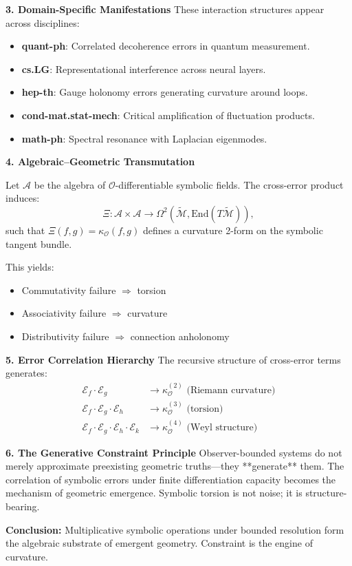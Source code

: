 \begin{scholium}
\textbf{3. Domain-Specific Manifestations}
These interaction structures appear across disciplines:
\begin{itemize}
    \item \textbf{quant-ph}: Correlated decoherence errors in quantum measurement.
    \item \textbf{cs.LG}: Representational interference across neural layers.
    \item \textbf{hep-th}: Gauge holonomy errors generating curvature around loops.
    \item \textbf{cond-mat.stat-mech}: Critical amplification of fluctuation products.
    \item \textbf{math-ph}: Spectral resonance with Laplacian eigenmodes.
\end{itemize}

\textbf{4. Algebraic–Geometric Transmutation}
\begin{theorem}
\label{theorem:bk4_multiplication_to_curvature}
Let $\mathcal{A}$ be the algebra of $\mathcal{O}$-differentiable symbolic fields. The cross-error product induces:
\[
\Xi: \mathcal{A} \times \mathcal{A} \rightarrow \Omega^2(\tilde{\mathcal{M}}, \mathrm{End}(T\tilde{\mathcal{M}})),
\]
such that $\Xi(f,g) = \kappa_{\mathcal{O}}(f,g)$ defines a curvature 2-form on the symbolic tangent bundle.
\end{theorem}

This yields:
\begin{itemize}
    \item Commutativity failure $\Rightarrow$ torsion
    \item Associativity failure $\Rightarrow$ curvature
    \item Distributivity failure $\Rightarrow$ connection anholonomy
\end{itemize}

\textbf{5. Error Correlation Hierarchy}
The recursive structure of cross-error terms generates:
\begin{align*}
    \mathcal{E}_f \cdot \mathcal{E}_g &\rightarrow \kappa_{\mathcal{O}}^{(2)} \text{ (Riemann curvature)} \\
    \mathcal{E}_f \cdot \mathcal{E}_g \cdot \mathcal{E}_h &\rightarrow \kappa_{\mathcal{O}}^{(3)} \text{ (torsion)} \\
    \mathcal{E}_f \cdot \mathcal{E}_g \cdot \mathcal{E}_h \cdot \mathcal{E}_k &\rightarrow \kappa_{\mathcal{O}}^{(4)} \text{ (Weyl structure)}
\end{align*}

\textbf{6. The Generative Constraint Principle}
Observer-bounded systems do not merely approximate preexisting geometric truths—they **generate** them. The correlation of symbolic errors under finite differentiation capacity becomes the mechanism of geometric emergence. Symbolic torsion is not noise; it is structure-bearing.

\textbf{Conclusion:} Multiplicative symbolic operations under bounded resolution form the algebraic substrate of emergent geometry. Constraint is the engine of curvature.

\end{scholium}


